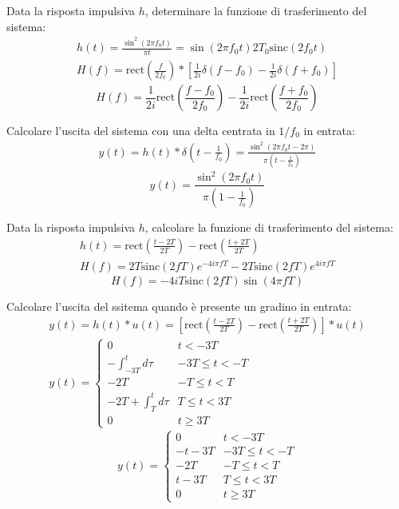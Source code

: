 \documentclass{article}
\begin{document}
Data la risposta impulsiva $h$, determinare la funzione di trasferimento del sistema:
\begin{gather*}
    h(t)=\displaystyle\frac{\sin^2(2\pi f_0t)}{\pi t}=\sin(2\pi f_0t)2T_0\mbox{sinc}(2f_0t)\\
    H(f)=\mbox{rect}\left(\displaystyle\frac{f}{2f_0}\right)*\left[\frac{1}{2i}\delta\left(f-f_0\right)-\frac{1}{2i}\delta(f+f_0)\right]
\end{gather*}
\begin{equation}
    H(f)=\displaystyle\frac{1}{2i}\mbox{rect}\left(\frac{f-f_0}{2f_0}\right)-\frac{1}{2i}\mbox{rect}\left(\frac{f+f_0}{2f_0}\right)
\end{equation}


Calcolare l'uscita del sistema con una delta centrata in $1/f_0$ in entrata:
\begin{gather*}
    y(t)=h(t)*\delta\left(\displaystyle t-\frac{1}{f_0}\right)=\frac{\sin^2\left(2\pi f_0t-2\pi\right)}{\pi \left(t-\frac{1}{f_0}\right)}
\end{gather*}
\begin{equation}
    y(t)=\displaystyle\frac{\sin^2(2\pi f_0t)}{\pi\left(1-\frac{1}{f_0}\right)}
\end{equation}


Data la risposta impulsiva $h$, calcolare la funzione di trasferimento del sistema:
\begin{gather*}
    h(t)=\mbox{rect}\left(\displaystyle\frac{t-2T}{2T}\right)-\mbox{rect}\left(\frac{t+2T}{2T}\right)\\
    H(f)=2T\mbox{sinc}(2fT)e^{-4i\pi fT}-2T\mbox{sinc}(2fT)e^{4i\pi fT}
\end{gather*}
\begin{equation}
    H(f)=-4iT\mbox{sinc}(2fT)\sin(4\pi fT)
\end{equation}


Calcolare l'uscita del ssitema quando è presente un gradino in entrata:
\begin{gather*}
    y(t)=h(t)*u(t)=\left[\mbox{rect}\left(\displaystyle\frac{t-2T}{2T}\right)-\mbox{rect}\left(\frac{t+2T}{2T}\right)\right]*u(t)\\
    y(t)=\begin{cases}
        0 &t<-3T\\
        \displaystyle-\int_{-3T}^td\tau &-3T\leq t<-T\\
        -2T &-T\leq t<T\\
        -2T+\displaystyle\int_{T}^{t}d\tau &T\leq t<3T\\
        0& t\geq 3T
    \end{cases}
\end{gather*}
\begin{equation}
    y(t)=\begin{cases}
        0 &t<-3T\\
        -t-3T&-3T\leq t<-T\\
        -2T &-T\leq t<T\\
        t-3T &T\leq t<3T\\
        0& t\geq 3T
    \end{cases}
\end{equation}
\end{document}
